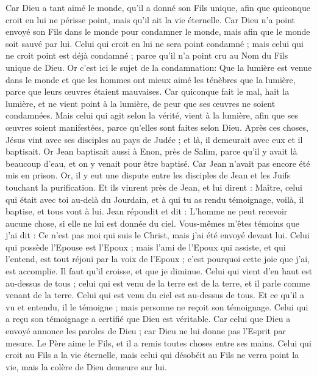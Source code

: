 \begin{multicols}{2}
Car Dieu a tant aimé le monde, qu'il a donné son Fils unique, afin que quiconque croit en lui ne périsse point, mais qu'il ait la vie éternelle.
Car Dieu n'a point envoyé son Fils dans le monde pour condamner le monde, mais afin que le monde soit sauvé par lui.
Celui qui croit en lui ne sera point condamné ; mais celui qui ne croit point est déjà condamné ; parce qu'il n'a point cru au Nom du Fils unique de Dieu.
Or c'est ici le sujet de la condamnation: Que la lumière est venue dans le monde et que les hommes ont mieux aimé les ténèbres que la lumière, parce que leurs œuvres étaient mauvaises.
Car quiconque fait le mal, hait la lumière, et ne vient point à la lumière, de peur que ses œuvres ne soient condamnées.
Mais celui qui agit selon la vérité, vient à la lumière, afin que ses œuvres soient manifestées, parce qu'elles sont faites selon Dieu.
Après ces choses, Jésus vint avec ses disciples au pays de Judée ; et là, il demeurait avec eux et il baptisait.
Or Jean baptisait aussi à Enon, près de Salim, parce qu'il y avait là beaucoup d'eau, et on y venait pour être baptisé.
Car Jean n'avait pas encore été mis en prison.
Or, il y eut une dispute entre les disciples de Jean et les Juifs touchant la purification.
Et ils vinrent près de Jean, et lui dirent : Maître, celui qui était avec toi au-delà du Jourdain, et à qui tu as rendu témoignage, voilà, il baptise, et tous vont à lui.
Jean répondit et dit : L'homme ne peut recevoir aucune chose, si elle ne lui est donnée du ciel.
Vous-mêmes m'êtes témoins que j'ai dit : Ce n'est pas moi qui suis le Christ, mais j'ai été envoyé devant lui.
Celui qui possède l'Epouse est l'Epoux ; mais l'ami de l'Epoux qui assiste, et qui l'entend, est tout réjoui par la voix de l'Epoux ; c'est pourquoi cette joie que j'ai, est accomplie.
Il faut qu'il croisse, et que je diminue.
Celui qui vient d'en haut est au-dessus de tous ; celui qui est venu de la terre est de la terre, et il parle comme venant de la terre. Celui qui est venu du ciel est au-dessus de tous.
Et ce qu'il a vu et entendu, il le témoigne ; mais personne ne reçoit son témoignage.
Celui qui a reçu son témoignage a certifié que Dieu est véritable.
Car celui que Dieu a envoyé annonce les paroles de Dieu ; car Dieu ne lui donne pas l'Esprit par mesure.
Le Père aime le Fils, et il a remis toutes choses entre ses mains.
Celui qui croit au Fils a la vie éternelle, mais celui qui désobéit au Fils ne verra point la vie, mais la colère de Dieu demeure sur lui.

\end{multicols}
